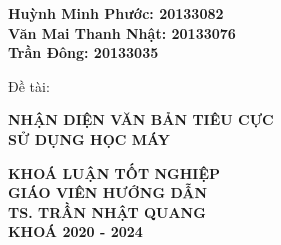 \begin{center}
    \fontsize{14pt}{21pt}
    \textbf{Huỳnh Minh Phước: 20133082}\\
    \textbf{Văn Mai Thanh Nhật: 20133076}\\
    \textbf{Trần Đông: 20133035}\\
    \begin{minipage}{0.8\textwidth}
        \fontsize{14pt}{21pt}
        Đề tài:
    \end{minipage}
\end{center}
\begin{center}
    \fontsize{20pt}{30pt}
    \textbf{NHẬN DIỆN VĂN BẢN TIÊU CỰC\\ SỬ DỤNG HỌC MÁY}\\
\end{center}
\vspace{0.3cm}
\begin{center}
    \fontsize{14pt}{21pt}
    \textbf{KHOÁ LUẬN TỐT NGHIỆP}\\
    \vspace{1CM}
    \textbf{GIÁO VIÊN HƯỚNG DẪN}\\
    \textbf{TS. TRẦN NHẬT QUANG}\\
    \vfill
    \textbf{KHOÁ 2020 - 2024}
\end{center}
\restoregeometry
